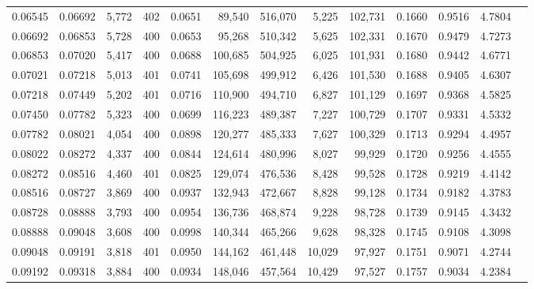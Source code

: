 \begin{tabular}{rrrrrrrrrrrrr}
0.06545 & 0.06692 & 5,772 & 402 &                                     0.0651 &  89,540 & 516,070 &   5,225 & 102,731 & 0.1660 & 0.9516 & 4.7804 \\
0.06692 & 0.06853 & 5,728 & 400 &                                     0.0653 &  95,268 & 510,342 &   5,625 & 102,331 & 0.1670 & 0.9479 & 4.7273 \\
0.06853 & 0.07020 & 5,417 & 400 &                                     0.0688 & 100,685 & 504,925 &   6,025 & 101,931 & 0.1680 & 0.9442 & 4.6771 \\
0.07021 & 0.07218 & 5,013 & 401 &                                     0.0741 & 105,698 & 499,912 &   6,426 & 101,530 & 0.1688 & 0.9405 & 4.6307 \\
0.07218 & 0.07449 & 5,202 & 401 &                                     0.0716 & 110,900 & 494,710 &   6,827 & 101,129 & 0.1697 & 0.9368 & 4.5825 \\
0.07450 & 0.07782 & 5,323 & 400 &                                     0.0699 & 116,223 & 489,387 &   7,227 & 100,729 & 0.1707 & 0.9331 & 4.5332 \\
0.07782 & 0.08021 & 4,054 & 400 &                                     0.0898 & 120,277 & 485,333 &   7,627 & 100,329 & 0.1713 & 0.9294 & 4.4957 \\
0.08022 & 0.08272 & 4,337 & 400 &                                     0.0844 & 124,614 & 480,996 &   8,027 &  99,929 & 0.1720 & 0.9256 & 4.4555 \\
0.08272 & 0.08516 & 4,460 & 401 &                                     0.0825 & 129,074 & 476,536 &   8,428 &  99,528 & 0.1728 & 0.9219 & 4.4142 \\
0.08516 & 0.08727 & 3,869 & 400 &                                     0.0937 & 132,943 & 472,667 &   8,828 &  99,128 & 0.1734 & 0.9182 & 4.3783 \\
0.08728 & 0.08888 & 3,793 & 400 &                                     0.0954 & 136,736 & 468,874 &   9,228 &  98,728 & 0.1739 & 0.9145 & 4.3432 \\
0.08888 & 0.09048 & 3,608 & 400 &                                     0.0998 & 140,344 & 465,266 &   9,628 &  98,328 & 0.1745 & 0.9108 & 4.3098 \\
0.09048 & 0.09191 & 3,818 & 401 &                                     0.0950 & 144,162 & 461,448 &  10,029 &  97,927 & 0.1751 & 0.9071 & 4.2744 \\
0.09192 & 0.09318 & 3,884 & 400 &                                     0.0934 & 148,046 & 457,564 &  10,429 &  97,527 & 0.1757 & 0.9034 & 4.2384 \\

\end{tabular}
